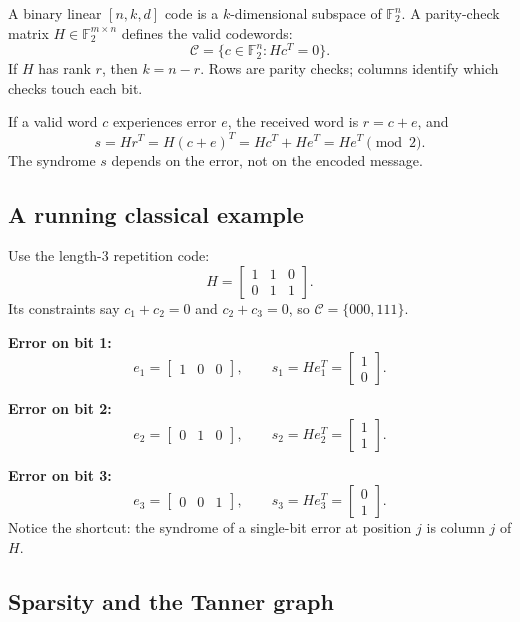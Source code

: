 \documentclass[11pt]{article}
\newcommand{\Ftwo}{\mathbb{F}_2}
\begin{document}
A binary linear \([n,k,d]\) code is a \(k\)-dimensional subspace of \(\Ftwo^n\). A parity-check
matrix \(H\in\Ftwo^{m\times n}\) defines the valid codewords:
\[
\mathcal C=\{c\in\Ftwo^n:Hc^T=0\}.
\]
If \(H\) has rank \(r\), then \(k=n-r\). Rows are parity checks; columns identify which checks
touch each bit.

If a valid word \(c\) experiences error \(e\), the received word is \(r=c+e\), and
\[
s=Hr^T=H(c+e)^T=Hc^T+He^T=He^T\pmod2.
\]
The syndrome \(s\) depends on the error, not on the encoded message.

\subsection{A running classical example}

Use the length-3 repetition code:
\[
H=\begin{bmatrix}1&1&0\\0&1&1\end{bmatrix}.
\]
Its constraints say \(c_1+c_2=0\) and \(c_2+c_3=0\), so
\(\mathcal C=\{000,111\}\).

\begin{workedbox}[title={Three hand-computed syndromes}]
\textbf{Error on bit 1:}
\[
e_1=\begin{bmatrix}1&0&0\end{bmatrix},\qquad
s_1=He_1^T=\begin{bmatrix}1\\0\end{bmatrix}.
\]

\textbf{Error on bit 2:}
\[
e_2=\begin{bmatrix}0&1&0\end{bmatrix},\qquad
s_2=He_2^T=\begin{bmatrix}1\\1\end{bmatrix}.
\]

\textbf{Error on bit 3:}
\[
e_3=\begin{bmatrix}0&0&1\end{bmatrix},\qquad
s_3=He_3^T=\begin{bmatrix}0\\1\end{bmatrix}.
\]
Notice the shortcut: the syndrome of a single-bit error at position \(j\) is column \(j\) of \(H\).
\end{workedbox}

\subsection{Sparsity and the Tanner graph}
\end{document}

